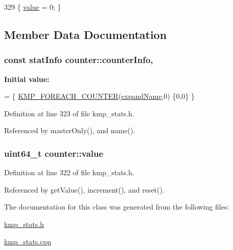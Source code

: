 \begin{DoxyCode}
329 \{ \hyperlink{classcounter_a86ec46cd3be151acee603a8cd9c93a4e}{value} = 0; \}
\end{DoxyCode}


\subsection{Member Data Documentation}
\hypertarget{classcounter_ad82a016108023b47028bb79151ab960f}{
\subsubsection[{counter\-Info}]{\setlength{\rightskip}{0pt plus 5cm}const {\bf stat\-Info} counter\-::counter\-Info\hspace{0.3cm}{\ttfamily [static]}, {\ttfamily [private]}}}\label{classcounter_ad82a016108023b47028bb79151ab960f}
{\bfseries Initial value\-:}
\begin{DoxyCode}
= \{
    \hyperlink{group__STATS__GATHERING_ga49fb18e6ba9abac7dcf1f9a202741b66}{KMP\_FOREACH\_COUNTER}(\hyperlink{kmp__stats_8cpp_a17949c412e2b08e907236b2d496ed7c1}{expandName},0)
    \{0,0\}
\}
\end{DoxyCode}


Definition at line 323 of file kmp\-\_\-stats.\-h.



Referenced by master\-Only(), and name().

\hypertarget{classcounter_a86ec46cd3be151acee603a8cd9c93a4e}{
\subsubsection[{value}]{\setlength{\rightskip}{0pt plus 5cm}uint64\-\_\-t counter\-::value\hspace{0.3cm}{\ttfamily [private]}}}\label{classcounter_a86ec46cd3be151acee603a8cd9c93a4e}


Definition at line 322 of file kmp\-\_\-stats.\-h.



Referenced by get\-Value(), increment(), and reset().



The documentation for this class was generated from the following files\-:\begin{DoxyCompactItemize}
\item 
\hyperlink{kmp__stats_8h}{kmp\-\_\-stats.\-h}\item 
\hyperlink{kmp__stats_8cpp}{kmp\-\_\-stats.\-cpp}\end{DoxyCompactItemize}
